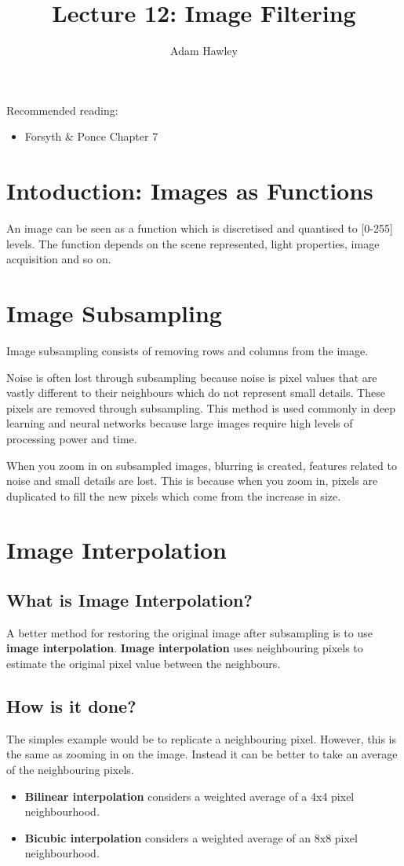 \documentclass{article}
\author{Adam Hawley}
\title{Lecture 12: Image Filtering}
\begin{document}
\maketitle
Recommended reading:
\begin{itemize}
	\item Forsyth \& Ponce Chapter 7
\end{itemize}

\section{Intoduction: Images as Functions}
An image can be seen as a function which is discretised and quantised to [0-255] levels.
The function depends on the scene represented, light properties, image acquisition and so on.

\section{Image Subsampling}
Image subsampling consists of removing rows and columns from the image.

Noise is often lost through subsampling because noise is pixel values that are vastly different to their neighbours which do not represent small details.
These pixels are removed through subsampling.
This method is used commonly in deep learning and neural networks because large images require high levels of processing power and time.

When you zoom in on subsampled images, blurring is created, features related to noise and small details are lost.
This is because when you zoom in, pixels are duplicated to fill the new pixels which come from the increase in size.

\section{Image Interpolation}
\subsection{What is Image Interpolation?}
A better method for restoring the original image after subsampling is to use \textbf{image interpolation}.
\textbf{Image interpolation} uses neighbouring pixels to estimate the original pixel value between the neighbours.

\subsection{How is it done?}
The simples example would be to replicate a neighbouring pixel.
However, this is the same as zooming in on the image.
Instead it can be better to take an average of the neighbouring pixels.
\begin{itemize}
	\item \textbf{Bilinear interpolation} considers a weighted average of a 4x4 pixel neighbourhood.
	\item \textbf{Bicubic interpolation} considers a weighted average of an 8x8 pixel neighbourhood.
\end{itemize}
\end{document}
